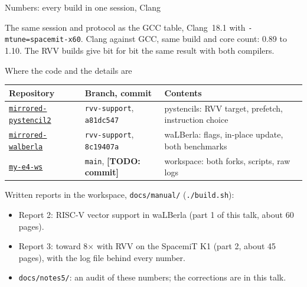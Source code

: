 \documentclass[aspectratio=169,10pt,t]{beamer}
\newcommand{\sx}[1]{#1\ensuremath{\times}} %
\newcommand{\code}[1]{\texttt{#1}}
\newif\ifshowtodos \showtodostrue
\newcommand{\todo}[1]{\ifshowtodos{\scriptsize\textcolor{psred}{\textbf{[TODO: #1]}}}\fi}
\begin{document}
\begin{frame}{Numbers: every build in one session, Clang}
  \vspace{3mm}
  \raggedright
  {\scriptsize\color{psgray}
  The same session and protocol as the GCC table, Clang~18.1 with \code{-mtune=spacemit-x60}.
  Clang against GCC, same build and core count: 0.89 to 1.10. The RVV builds give bit for bit the
  same result with both compilers.\par}
\end{frame}

\begin{frame}{Where the code and the details are}
  \vspace{1mm}
  \small
  \begin{tabularx}{\textwidth}{@{}l l X@{}}
    \toprule
    Repository & Branch, commit & Contents\\
    \midrule
    \href{https://github.com/salehjg/mirrored-pystencil2/tree/rvv-support}{\code{mirrored-pystencil2}}
      & \code{rvv-support}, \code{a81dc547} & pystencils: RVV target, prefetch, instruction choice\\
    \href{https://github.com/salehjg/mirrored-walberla/tree/rvv-support}{\code{mirrored-walberla}}
      & \code{rvv-support}, \code{8c19407a} & waLBerla: flags, in-place update, both benchmarks\\
    \href{https://github.com/salehjg/my-e4-ws}{\code{my-e4-ws}} & \code{main}, \todo{commit}
      & workspace: both forks, scripts, raw logs\\
    \bottomrule
  \end{tabularx}

  \vspace{4mm}
  Written reports in the workspace, \code{docs/manual/} (\code{./build.sh}):
  \begin{itemize}\small
    \item Report 2: RISC-V vector support in waLBerla (part 1 of this talk, about 60 pages).
    \item Report 3: toward \sx{8} with RVV on the SpacemiT K1 (part 2, about 45 pages), with
          the log file behind every number.
    \item \code{docs/notes5/}: an audit of these numbers; the corrections are in this talk.
  \end{itemize}
  \vfill
  \vspace{2mm}
\end{frame}
\end{document}
